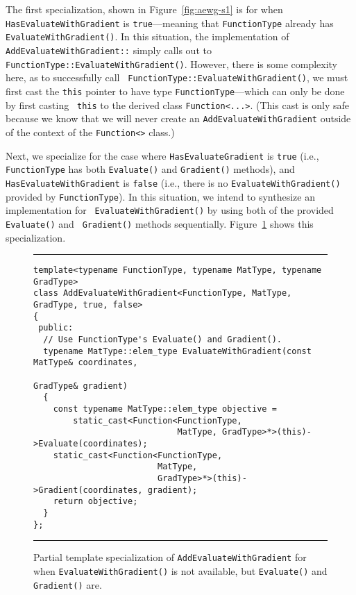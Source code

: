 The first specialization, shown in Figure~\ref{fig:aewg-s1} is for when {\tt
HasEvaluateWithGradient} is {\tt true}---meaning that {\tt FunctionType} already
has {\tt EvaluateWithGradient()}.  In this situation, the implementation of {\tt
AddEvaluateWithGradient::} simply calls
out to {\tt FunctionType::EvaluateWithGradient()}.  However, there is some
complexity here, as to successfully call {\tt
FunctionType::EvaluateWithGradient()}, we must first cast the {\tt this} pointer
to have type {\tt FunctionType}---which can only be done by first casting {\tt
this} to the derived class {\tt Function<...>}.  (This cast is only safe because
we know that we will never create an {\tt AddEvaluateWithGradient} outside of
the context of the {\tt Function<>} class.)

Next, we specialize for the case where {\tt HasEvaluateGradient} is {\tt true}
(i.e., {\tt FunctionType} has both {\tt Evaluate()} and {\tt Gradient()}
methods), and {\tt HasEvaluateWithGradient} is {\tt false} (i.e., there is no
{\tt EvaluateWithGradient()} provided by {\tt FunctionType}).  In this
situation, we intend to synthesize an implementation for {\tt
EvaluateWithGradient()} by using both of the provided {\tt Evaluate()} and {\tt
Gradient()} methods sequentially.  Figure~\ref{fig:aewg-s2} shows this
specialization.

\begin{figure}[t!]
\hrule
\vspace{1ex}
\begin{verbatim}
template<typename FunctionType, typename MatType, typename GradType>
class AddEvaluateWithGradient<FunctionType, MatType, GradType, true, false>
{
 public:
  // Use FunctionType's Evaluate() and Gradient().
  typename MatType::elem_type EvaluateWithGradient(const MatType& coordinates,
                                                   GradType& gradient)
  {
    const typename MatType::elem_type objective =
        static_cast<Function<FunctionType,
                             MatType, GradType>*>(this)->Evaluate(coordinates);
    static_cast<Function<FunctionType,
                         MatType,
                         GradType>*>(this)->Gradient(coordinates, gradient);
    return objective;
  }
};
\end{verbatim}
\hrule
\vspace*{-0.5em}
\caption{Partial template specialization of {\tt AddEvaluateWithGradient} for
when {\tt EvaluateWithGradient()} is not available, but {\tt Evaluate()} and
{\tt Gradient()} are.}
\label{fig:aewg-s2}
\end{figure}

